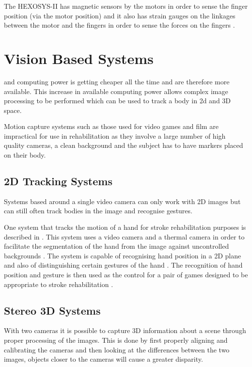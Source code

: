 \documentclass[journal]{IEEEtran}
\begin{document}
The HEXOSYS-II has magnetic sensors by the motors in order to sense the finger position (via 
the motor position) and it also has strain gauges on the linkages between the motor and the fingers 
in order to sense the forces on the fingers \cite{HandExo}.

\section{Vision Based Systems}
 and computing power is getting cheaper all the time and are therefore 
more available. This increase in available computing power allows complex image processing to be performed 
which can be used to track a body in 2d and 3D space.

Motion capture systems such as those used for video games and film are impractical for use in 
rehabilitation as they involve a large number of high quality cameras, a clean background and 
the subject has to have markers placed on their body.

\subsection{2D Tracking Systems}
Systems based around a single video camera can only work with 2D images but can still often track 
bodies in the image and recognise gestures.

One system that tracks the motion of a hand for stroke rehabilitation purposes is described in \cite{SeriousGames}. 
This system uses a video camera and a thermal camera in order to facilitate the segmentation of the hand from the 
image against uncontrolled backgrounds \cite{SeriousGames}. The system is capable of recognising hand position 
in a 2D plane and also of distinguishing certain gestures of the hand \cite{SeriousGames}. The recognition 
of hand position and gesture is then used as the control for a pair of games designed to be appropriate to 
stroke rehabilitation \cite{SeriousGames}.

\subsection{Stereo 3D Systems}
With two cameras it is possible to capture 3D information about a scene through proper processing of the 
images. This is done by first properly aligning and calibrating the cameras and then looking at the differences 
between the two images, objects closer to the cameras will cause a greater disparity.
\end{document}
